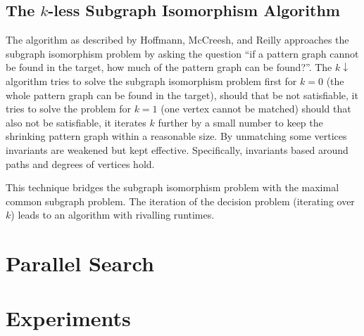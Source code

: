 \documentclass{llncs}
\begin{document}
\subsection{The $k$-less Subgraph Isomorphism Algorithm}

The algorithm as described by Hoffmann, McCreesh, and Reilly \cite{DBLP:conf/aaai/HoffmannMR17} approaches the subgraph isomorphism problem by asking the question ``if a pattern graph cannot be found in the target, how much of the pattern graph can be found?''. The $k{\downarrow}$ algorithm tries to solve the subgraph isomorphism problem first for $k=0$ (the whole pattern graph can be found in the target), should that be not satisfiable, it tries to solve the problem for $k=1$ (one vertex cannot be matched) should that also not be satisfiable, it iterates $k$ further by a small number to keep the shrinking pattern graph within a reasonable size. By unmatching some vertices  invariants are weakened but kept effective. Specifically, invariants based around paths and degrees of vertices hold.

This technique bridges the subgraph isomorphism problem with the maximal common subgraph problem. The iteration of the decision problem (iterating over $k$) leads to an algorithm with rivalling runtimes.

\section{Parallel Search}

\section{Experiments}
\end{document}
